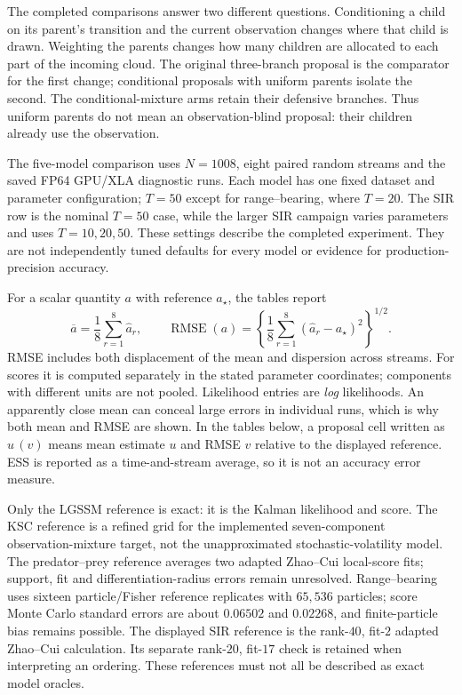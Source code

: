 The completed comparisons answer two different questions. Conditioning a child
on its parent's transition and the current observation changes where that child
is drawn. Weighting the parents changes how many children are allocated to each
part of the incoming cloud. The original three-branch proposal is the comparator
for the first change; conditional proposals with uniform parents isolate the
second. The conditional-mixture arms retain their defensive branches. Thus
uniform parents do not mean an observation-blind proposal: their children
already use the observation.

The five-model comparison uses $N=1008$, eight paired random streams and the
saved FP64 GPU/XLA diagnostic runs. Each model has one fixed dataset and
parameter configuration; $T=50$ except for range--bearing, where $T=20$.
The SIR row is the nominal $T=50$ case, while the larger SIR campaign varies
parameters and uses $T=10,20,50$. These settings describe the completed
experiment. They are not independently tuned defaults for every model or
evidence for production-precision accuracy.

For a scalar quantity $a$ with reference $a_\star$, the tables report
\begin{equation}
 \overline a=\frac18\sum_{r=1}^8\widehat a_r,
 \qquad
 \operatorname{RMSE}(a)=
 \left\{\frac18\sum_{r=1}^8(\widehat a_r-a_\star)^2\right\}^{1/2}.
\end{equation}
RMSE includes both displacement of the mean and dispersion across streams.
For scores it is computed separately in the stated parameter coordinates;
components with different units are not pooled. Likelihood entries are
\emph{log} likelihoods. An apparently close mean can conceal large errors in
individual runs, which is why both mean and RMSE are shown.
In the tables below, a proposal cell written as $u\,(v)$ means mean estimate
$u$ and RMSE $v$ relative to the displayed reference. ESS is reported as a
time-and-stream average, so it is not an accuracy error measure.

Only the LGSSM reference is exact: it is the Kalman likelihood and score.
The KSC reference is a refined grid for the implemented seven-component
observation-mixture target, not the unapproximated stochastic-volatility
model. The predator--prey reference averages two adapted Zhao--Cui local-score
fits; support, fit and differentiation-radius errors remain unresolved.
Range--bearing uses sixteen particle/Fisher reference replicates with
$65{,}536$ particles; score Monte Carlo standard errors are about $0.06502$
and $0.02268$, and finite-particle bias remains possible. The displayed SIR
reference is the rank-$40$, fit-$2$ adapted Zhao--Cui calculation. Its separate
rank-$20$, fit-$17$ check is retained when interpreting an ordering. These
references must not all be described as exact model oracles.

